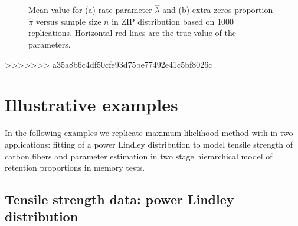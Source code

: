 \documentclass[nojss]{jss}
\begin{document}
\begin{figure}[H]
\begin{subfigure}[h]{0.49\textwidth}
        \caption{\label{fig:ZIPb}}
    \end{subfigure}
\caption{\label{fig:ZIP} Mean value for (a) rate parameter $\hat{\lambda}$ and (b) extra zeros proportion $\hat{\pi}$ versus sample size $n$ in ZIP distribution based on 1000 replications. Horizontal red lines are the true value of the parameters.}
\end{figure}

>>>>>>> a35a8b6c4df50cfe93d75be77492e41c5bf8026c


\section{Illustrative examples} \label{sec:illustrations}

In the following examples we replicate maximum likelihood method with  in two applications: fitting of a power Lindley distribution to model tensile strength of carbon fibers and parameter estimation in two stage hierarchical model of retention proportions in memory tests.

\subsection{Tensile strength data: power Lindley distribution}
\end{document}
